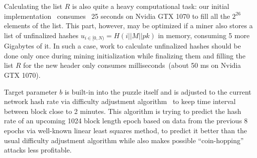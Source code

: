 Calculating the list $R$ is also quite a heavy computational task: our initial implementation~\cite{ergoMiner}
consumes ~25 seconds on Nvidia GTX 1070 to fill all the $2^{26}$ elements of the list.
This part, however, may be optimized if a miner also stores a list of unfinalized hashes $u_{i \in [0,N)}=H(i||M||pk)$
in memory, consuming 5 more Gigabytes of it. In such a case, work to calculate unfinalized hashes should
be done only once during mining initialization while finalizing them and filling the list $R$
for the new header only consumes milliseconds~(about 50 ms on Nvidia GTX 1070).

Target parameter $b$ is built-in into the puzzle itself
and is adjusted to the current network hash rate via difficulty adjustment
algorithm~\cite{meshkov2017short} to keep time interval between block close to 2 minutes.
This algorithm is trying to predict the hash rate of an upcoming 1024 block length epoch
based on data from the previous 8 epochs via well-known linear least squares method,
to predict it better than the usual difficulty adjustment algorithm while also makes possible
``coin-hopping'' attacks less profitable.